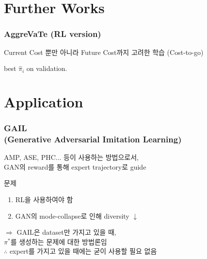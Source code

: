 \documentclass[11pt,xcolor={dvipsnames},hyperref={pdftex,pdfpagemode=UseNone,hidelinks,pdfdisplaydoctitle=true},usepdftitle=false]{beamer}
\begin{document}
\section*{Further Works}

\begin{frame}
\frametitle{AggreVaTe (RL version)}

{\small Current Cost 뿐만 아니라 Future Cost까지 고려한 학습 (Cost-to-go)}

\vspace{5mm}

\begin{algorithm}[H]
    \small
    \SetAlgoLined
    \Return best $\hat{\pi}_i$ on validation.
    \end{algorithm}

\end{frame}

\section*{Application}

\begin{frame}
\end{frame}


\begin{frame}
\frametitle{GAIL \\ (Generative Adversarial Imitation Learning)}

AMP, ASE, PHC... 등이 사용하는 방법으로서, \\
GAN의 reward를 통해 expert trajectory로 guide

\vspace{5mm}

문제
\begin{enumerate}
\item RL을 사용하여야 함
\item GAN의 mode-collapse로 인해 diversity $\downarrow$ 
\end{enumerate}

\vspace{5mm}

$\Longrightarrow$ GAIL은 dataset만 가지고 있을 때, \\ 
\quad $\pi^*$를 생성하는 문제에 대한 방법론임 \\
$\therefore$ expert를 가지고 있을 때에는 굳이 사용할 필요 없음

\end{frame}
\end{document}

